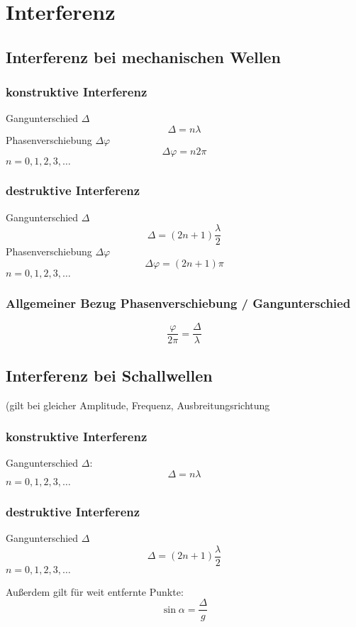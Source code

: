 \chapter{Interferenz}
	\section{Interferenz bei mechanischen Wellen}
		\subsection{konstruktive Interferenz}
			Gangunterschied $\Delta$
			\[\Delta = n \lambda \]
			Phasenverschiebung $\Delta\varphi$
			\[\Delta\varphi = n 2 \pi \]
			$n = 0,1,2,3,\dots$
			
		\subsection{destruktive Interferenz}
			Gangunterschied $\Delta$
			\[\Delta = (2n + 1) \frac{\lambda}{2} \]
			Phasenverschiebung $\Delta\varphi$
			\[\Delta\varphi = (2 n +1)\pi \]
			$n = 0,1,2,3,\dots$		
		
	\subsection{Allgemeiner Bezug Phasenverschiebung / Gangunterschied}
		\[ \frac{\varphi}{2\pi} = \frac{\Delta}{\lambda} \]
		
	\section{Interferenz bei Schallwellen}
		(gilt bei gleicher Amplitude, Frequenz, Ausbreitungsrichtung
			
		\subsection{konstruktive Interferenz}
			Gangunterschied $\Delta$:
			\[ \Delta = n \lambda \]
			$n = 0,1,2,3,\dots$
			
		\subsection{destruktive Interferenz}
			Gangunterschied $\Delta$
			\[ \Delta = (2n +1) \frac{\lambda}{2} \]
			$n = 0,1,2,3,\dots$
			
			Außerdem gilt für weit entfernte Punkte:
			\[\sin \alpha = \frac{\Delta}{g} \]
			
